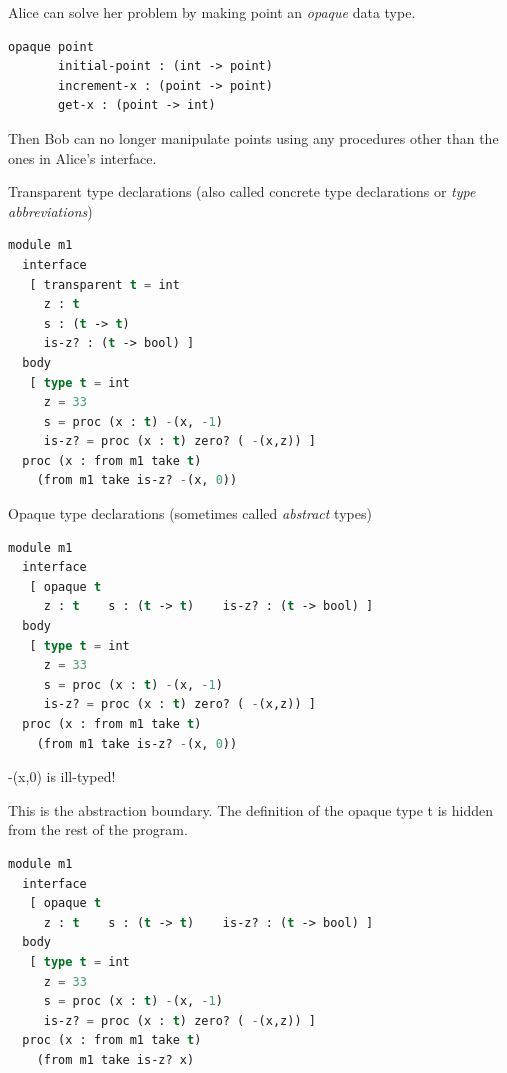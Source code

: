 \documentclass{article}
\begin{document}
\begin{huge}
Alice can solve her problem by making point an {\it opaque} data type.

\begin{lstlisting}[language=Lisp]
     opaque point
       initial-point : (int -> point)
       increment-x : (point -> point)
       get-x : (point -> int)
\end{lstlisting}   

Then Bob can no longer manipulate points using any procedures other than the ones in Alice's interface.


Transparent type declarations (also called concrete type declarations or {\it type abbreviations})

\begin{lstlisting}[language=Lisp]
module m1
  interface
   [ transparent t = int
     z : t
     s : (t -> t)
     is-z? : (t -> bool) ]
  body
   [ type t = int
     z = 33
     s = proc (x : t) -(x, -1)
     is-z? = proc (x : t) zero? ( -(x,z)) ]
  proc (x : from m1 take t)
    (from m1 take is-z? -(x, 0))
\end{lstlisting}   



Opaque type declarations (sometimes called {\it abstract} types)

\begin{lstlisting}[language=Lisp]
module m1
  interface
   [ opaque t
     z : t    s : (t -> t)    is-z? : (t -> bool) ]
  body
   [ type t = int
     z = 33
     s = proc (x : t) -(x, -1)
     is-z? = proc (x : t) zero? ( -(x,z)) ]
  proc (x : from m1 take t)
    (from m1 take is-z? -(x, 0))
\end{lstlisting}   

-(x,0) is ill-typed!


This is the abstraction boundary. The definition of the opaque type t is hidden from the rest of 
the program.

\begin{lstlisting}[language=Lisp]
module m1
  interface
   [ opaque t
     z : t    s : (t -> t)    is-z? : (t -> bool) ]
  body
   [ type t = int
     z = 33
     s = proc (x : t) -(x, -1)
     is-z? = proc (x : t) zero? ( -(x,z)) ]
  proc (x : from m1 take t)
    (from m1 take is-z? x)
\end{lstlisting}  


\end{huge}
\end{document}
